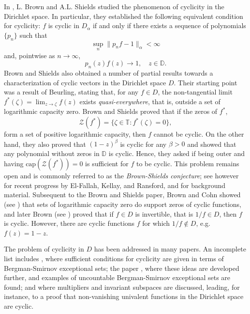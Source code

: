 \documentclass[11 pt,reqno]{amsart}
\theoremstyle{definition}
\theoremstyle{remark}
\numberwithin{equation}{section} \numberwithin{figure}{section}
\newcommand{\DD}{{\mathbb D}}
\newcommand{\TT}{{\mathbb T}}
\begin{document}
In \cite{BS84}, L. Brown and A.L. Shields studied
the phenomenon of cyclicity in the Dirichlet space. In
particular, they established the following equivalent condition for
cyclicity: $f$ is cyclic in $D_{\alpha}$ if and only if there
exists a sequence of polynomials $\{p_n\}$ such that
\begin{equation}
\sup_n\|p_nf-1\|_{\alpha}<\infty
\label{cyclicitycond:unifbound}
\end{equation}
and, pointwise as $n\rightarrow \infty$,
\begin{equation}
p_n(z)f(z)\rightarrow 1, \quad z \in \DD.
\label{cyclicitycond:pointwise}
\end{equation}
Brown and Shields also obtained a number of partial results towards
a characterization of cyclic vectors in the Dirichlet space $D$.
Their starting point was a result of Beurling, stating that, for any $f \in D$,
the non-tangential limit $f^*(\zeta)=\lim_{z \rightarrow \zeta}f(z)$
exists {\it quasi-everywhere}, that is, outside a set of logarithmic
capacity zero. Brown and Shields proved that if the zeros of $f^*$,
\[\mathcal{Z}(f^*)=\{\zeta \in \TT\colon f^*(\zeta)=0\},\]
form a set of positive logarithmic capacity, then $f$ cannot be
cyclic. On the other hand, they also proved that
$(1-z)^{\beta}$ is cyclic for any $\beta>0$ and showed
that any polynomial without zeros in $\DD$ is cyclic. Hence, they
asked if being outer and having $\textrm{cap}(\mathcal{Z}(f^*))=0$ is
sufficient for $f$ to be cyclic. This problem remains open and is
commonly referred to as the {\it{Brown-Shields conjecture}}; see however
\cite{EKR09} for recent progress by El-Fallah, Kellay, and Ransford,
and for background material. Subsequent to the Brown and Shields paper, Brown and Cohn
showed (see \cite{BC85}) that sets of logarithmic capacity zero do support
zeros of cyclic functions, and later Brown (see \cite{Brown90})
proved that if $f\in D$ is invertible, that is $1/f\in D$, then $f$ is cyclic.
However, there are cyclic functions $f$ for which $1/f\notin D$,
e.g. $f(z)=1-z$.

The problem of cyclicity in $D$ has been addressed in many papers.
An incomplete list includes \cite{HS90}, where sufficient conditions
for cyclicity are given in terms of Bergman-Smirnov exceptional sets; the paper
\cite{EKR06}, where these ideas are developed further, and examples of uncountable
Bergman-Smirnov exceptional sets are found; and \cite{RS92} where multipliers and
invariant subspaces are discussed, leading, for instance, to a proof that
non-vanishing univalent functions in the Dirichlet space are cyclic.
\end{document}
